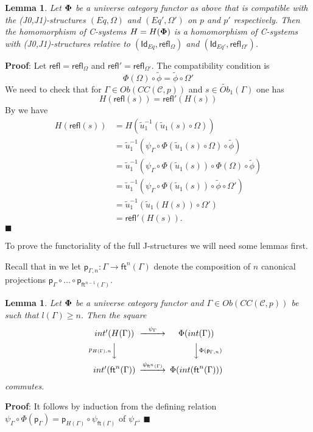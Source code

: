 \documentclass[12pt]{article}
\numberwithin{equation}{section}
\newenvironment{myproof}{{\bf Proof}:}{$\blacksquare$ \vskip 5mm }
\newtheorem{lemma}[proposition]{Lemma}
\newcommand{\llabel}[1]{\label{#1}}
\newcommand{\sr}{\rightarrow}
\newcommand{\wt}{\widetilde}
\newcommand{\toCC}{CC} %
\newcommand{\C}{{\mathcal C}}  %
\newcommand{\ft}{\mathsf{ft}}
\newcommand{\p}{\mathsf{p}}
\newcommand{\Id}{\mathsf{Id}} %
\newcommand{\refl}{\mathsf{refl}}
\newcommand{\Obwt}{\wt{Ob}}
\begin{document}
\begin{lemma}
\llabel{2015.04.12.l2} Let ${\bf\Phi}$ be a universe category functor as above
that is compatible with the (J0,J1)-structures $(Eq,\Omega)$ and
$(Eq',\Omega')$ on $p$ and $p'$ respectively. Then the homomorphism of
C-systems $H=H({\bf\Phi})$ is a homomorphism of C-systems with
(J0,J1)-structures relative to $(\Id_{Eq},\refl_{\Omega})$ and
$(\Id_{Eq'},\refl_{\Omega'})$.
\end{lemma}
%
\begin{myproof}
Let $\refl=\refl_{\Omega}$ and $\refl'=\refl_{\Omega'}$. The compatibility
condition is
%
$$\Phi(\Omega)\circ\wt{\phi}=\wt{\phi}\circ\Omega'$$
%
We need to check that for $\Gamma\in Ob(\toCC({\C},p))$ and $s\in
\Obwt_1(\Gamma)$ one has
%
$$H(\refl(s))=\refl'(H(s))$$
%
By \cite[Lemma 6.1(2)]{fromunivwithPi} we have
%
\begin{align*}
  H(\refl(s))
    & = H(\wt{u}_1^{-1}(\wt{u}_1(s)\circ\Omega)) \\
    & = \wt{u}_1^{-1}(\psi_{\Gamma}\circ\Phi(\wt{u}_1(s)\circ\Omega)\circ\wt{\phi}) \\
    & = \wt{u}_1^{-1}(\psi_{\Gamma}\circ\Phi(\wt{u}_1(s))\circ\Phi(\Omega)\circ \wt{\phi}) \\
    & = \wt{u}_1^{-1}(\psi_{\Gamma}\circ\Phi(\wt{u}_1(s))\circ\wt{\phi}\circ\Omega') \\
    & = \wt{u}_1^{-1}(\wt{u}_1(H(s))\circ\Omega') \\
    & = \refl'(H(s)).
\end{align*}
\end{myproof}
%

To prove the functoriality of the full J-structures we will need some lemmas
first.

Recall that in \cite{Csubsystems} we let $\p_{\Gamma,n}:\Gamma\sr \ft^n(\Gamma)$
denote the composition of $n$ canonical projections $\p_{\Gamma}\circ \dots\circ
\p_{\ft^{n-1}(\Gamma)}$.
%
\begin{lemma}
\llabel{2015.05.10.l1} Let ${\bf\Phi}$ be a universe category functor and
$\Gamma\in Ob(\toCC({\C},p))$ be such that $l(\Gamma)\ge n$. Then the
square
%
$$
\begin{CD}
int'(H(\Gamma)) @>\psi_{\Gamma}>> \Phi(int(\Gamma))\\ @Vp_{H(\Gamma),n} VV
@VV\Phi(\p_{\Gamma,n})V\\ int'(\ft^n(\Gamma)) @>\psi_{\ft^n(\Gamma)}>>
\Phi(int(\ft^n(\Gamma)))
\end{CD}
$$
%
commutes.
\end{lemma}
%
\begin{myproof}
It follows by induction from the defining relation
$\psi_{\Gamma}\circ \Phi(\p_{\Gamma})=\p_{H(\Gamma)}\circ \psi_{\ft(\Gamma)}$
of $\psi_{\Gamma}$.
\end{myproof}
\end{document}
